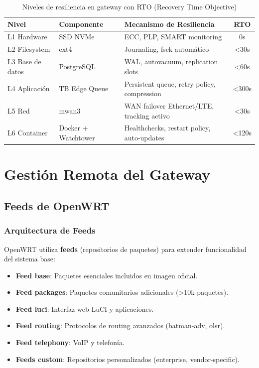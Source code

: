 \begin{table}[h]
\centering
\small
\begin{tabular}{|l|l|p{5cm}|c|}
\hline
\textbf{Nivel} & \textbf{Componente} & \textbf{Mecanismo de Resiliencia} & \textbf{RTO} \\
\hline
L1 Hardware & SSD NVMe & ECC, PLP, SMART monitoring & 0s \\
L2 Filesystem & ext4 & Journaling, fsck automático & <30s \\
L3 Base de datos & PostgreSQL & WAL, autovacuum, replication slots & <60s \\
L4 Aplicación & TB Edge Queue & Persistent queue, retry policy, compression & <300s \\
L5 Red & mwan3 & WAN failover Ethernet/LTE, tracking activo & <30s \\
L6 Container & Docker + Watchtower & Healthchecks, restart policy, auto-updates & <120s \\
\hline
\end{tabular}
\caption{Niveles de resiliencia en gateway con RTO (Recovery Time Objective)}
\end{table}

\section{Gestión Remota del Gateway}

\subsection{Feeds de OpenWRT}

\subsubsection{Arquitectura de Feeds}

OpenWRT utiliza \textbf{feeds} (repositorios de paquetes) para extender funcionalidad del sistema base:

\begin{itemize}
    \item \textbf{Feed base}: Paquetes esenciales incluidos en imagen oficial.
    \item \textbf{Feed packages}: Paquetes comunitarios adicionales (>10k paquetes).
    \item \textbf{Feed luci}: Interfaz web LuCI y aplicaciones.
    \item \textbf{Feed routing}: Protocolos de routing avanzados (batman-adv, olsr).
    \item \textbf{Feed telephony}: VoIP y telefonía.
    \item \textbf{Feeds custom}: Repositorios personalizados (enterprise, vendor-specific).
\end{itemize}

